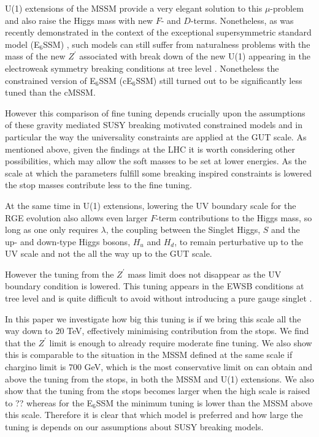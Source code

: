 \documentclass[preprint,amsmath,amssymb,aps,superscriptaddress,prd,showpacs,floatfix,nofootinbib]{revtex4-1}
\begin{document}
U(1) extensions of the MSSM provide a very elegant solution to this
$\mu$-problem \cite{Fayet:1977yc, Kim:1983dt, Suematsu:1994qm,
  Cvetic:1995rj, Cvetic:1996mf, Jain:1995cb, Nir:1995bu,
  Cvetic:1997ky} and also raise the Higgs mass with new $F$- and
$D$-terms. Nonetheless, as was recently demonstrated in the context of
the exceptional supersymmetric standard model (E$_6$SSM)
\cite{King:2005jy,King:2005my,Athron:2010zz}, such models can still
suffer from naturalness problems with the mass of the new $Z^\prime$
associated with break down of the new U(1) appearing in the
electroweak symmetry breaking conditions at tree level
\cite{Athron:2013ipa}.  Nonetheless the constrained version of
E$_6$SSM (cE$_6$SSM) \cite{Athron:2009ue, Athron:2009bs} still turned
out to be significantly less tuned than the cMSSM.

However this comparison of fine tuning depends crucially upon the
assumptions of these gravity mediated SUSY breaking motivated
constrained models and in particular the way the universality
constraints are applied at the GUT scale.  As mentioned above, given
the findings at the LHC it is worth considering other possibilities,
which may allow the soft masses to be set at lower energies. As the
scale at which the parameters fulfill some breaking inspired
constraints is lowered the stop masses contribute less to the fine
tuning.

At the same time in U(1) extensions, lowering the UV boundary scale
for the RGE evolution also allows even larger $F$-term contributions
to the Higgs mass, so long as one only requires $\lambda$, the
coupling between the Singlet Higgs, $S$ and the up- and down-type
Higgs bosons, $H_u$ and $H_d$, to remain perturbative up to the UV
scale and not the all the way up to the GUT scale.

However the tuning from the $Z^\prime$ mass limit does not disappear
as the UV boundary condition is lowered. This tuning appears in the
EWSB conditions at tree level and is quite difficult to avoid without
introducing a pure gauge singlet \cite{Athron:2014pua}.



In this paper we investigate how big this tuning is if we bring this
scale all the way down to 20 TeV, effectively minimising contribution
from the stops. We find that the $Z^\prime$ limit is enough to already
require moderate fine tuning.  We also show this is comparable to the
situation in the MSSM defined at the same scale if chargino limit is
$700$ GeV, which is the most conservative limit on can obtain and
above the tuning from the stops, in both the MSSM and U(1) extensions.
We also show that the tuning from the stops becomes larger when the
high scale is raised to ?? whereas for the E$_6$SSM the minimum tuning
is lower than the MSSM above this scale.  Therefore it is clear that
which model is preferred and how large the tuning is depends on our
assumptions about SUSY breaking models.
\end{document}
